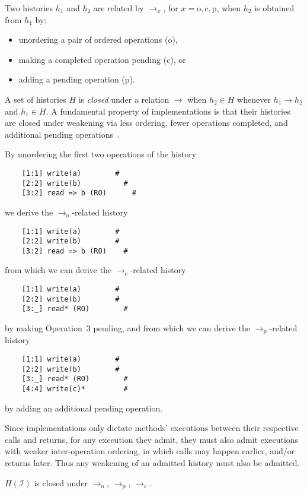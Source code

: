 Two histories $h_1$ and $h_2$ are related by $\to_x$, for $x = \mathrm{o},
\mathrm{c}, \mathrm{p}$, when $h_2$ is obtained from $h_1$ by:
\begin{itemize}

  \item unordering a pair of ordered operations (o),

  \item making a completed operation pending (c), or

  \item adding a pending operation (p).

\end{itemize}
A set of histories $H$ is \emph{closed} under a relation $\to$ when $h_2 \in H$
whenever $h_1 \to h_2$ and $h_1 \in H$. A fundamental property of
implementations is that their histories are closed under weakening via less
ordering, fewer operations completed, and additional pending
operations~\cite{conf/popl/BouajjaniEEH15}.

\begin{example}

  By unordering the first two operations of the history
\begin{verbatim}
    [1:1] write(a)        #
    [2:2] write(b)          #
    [3:2] read => b (RO)      #
\end{verbatim}
  we derive the $\to_\mathrm{o}$-related history
\begin{verbatim}
    [1:1] write(a)        #
    [2:2] write(b)        #
    [3:2] read => b (RO)    #
\end{verbatim}
  from which we can derive the $\to_\mathrm{c}$-related history
\begin{verbatim}
    [1:1] write(a)        #
    [2:2] write(b)        #
    [3:_] read* (RO)        #
\end{verbatim}
  by making Operation~$3$ pending, and from which we can derive the
  $\to_\mathrm{p}$-related history
\begin{verbatim}
    [1:1] write(a)        #
    [2:2] write(b)        #
    [3:_] read* (RO)        #
    [4:4] write(c)*         #
\end{verbatim}
  by adding an additional pending operation.

\end{example}

Since implementations only dictate methods' executions between their respective
calls and returns, for any execution they admit, they must also admit executions
with weaker inter-operation ordering, in which calls may happen earlier, and/or
returns later. Thus any weakening of an admitted history must also be admitted.

\begin{lemma}

  $H(\mathcal{I})$ is closed under $\to_\mathrm{o}$, $\to_\mathrm{p}$,
  $\to_\mathrm{c}$.

\end{lemma}
